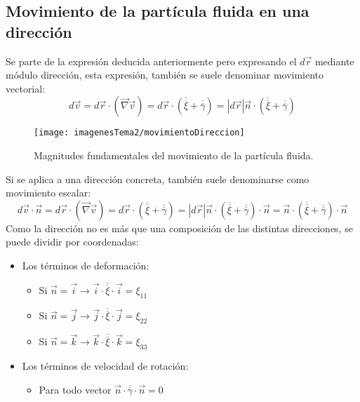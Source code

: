 \subsection{Movimiento de la partícula fluida en una dirección}
Se parte de la expresión deducida anteriormente pero expresando el $d\vec{r}$ mediante módulo dirección, esta expresión, también se suele denominar movimiento vectorial:
\[d\vec{v}=d\vec{r}\cdot\left(\vec{\nabla}\vec{v}\right)=d\vec{r}\cdot\left(\overline{\overline{\xi}}+\overline{\overline{\gamma}}\right)=|d\vec{r}|\vec{n}\cdot\left(\overline{\overline{\xi}}+\overline{\overline{\gamma}}\right)\]
\begin{figure}[H]
	\centering
	\texttt{[image: imagenesTema2/movimientoDireccion]}
	\caption{Magnitudes fundamentales del movimiento de la partícula fluida.}
	\label{fig:movimientodireccion}
\end{figure}
Si se aplica a una dirección concreta, también suele denominarse como movimiento escalar:
\[d\vec{v}\cdot\vec{n}=d\vec{r}\cdot\left(\vec{\nabla}\vec{v}\right)=d\vec{r}\cdot\left(\overline{\overline{\xi}}+\overline{\overline{\gamma}}\right)=|d\vec{r}|\vec{n}\cdot\left(\overline{\overline{\xi}}+\overline{\overline{\gamma}}\right)\cdot\vec{n}=\vec{n}\cdot\left(\overline{\overline{\xi}}+\overline{\overline{\gamma}}\right)\cdot\vec{n}\]
Como la dirección no es más que una composición de las distintas direcciones, se puede dividir por coordenadas:
\begin{itemize}
	\item Los términos de deformación:
	\begin{itemize}
		\item Si $\vec{n}=\vec{i}\rightarrow\vec{i}\cdot\overline{\overline{\xi}}\cdot\vec{i}=\xi_{11}$
		\item Si $\vec{n}=\vec{j}\rightarrow\vec{j}\cdot\overline{\overline{\xi}}\cdot\vec{j}=\xi_{22}$
		\item Si $\vec{n}=\vec{k}\rightarrow\vec{k}\cdot\overline{\overline{\xi}}\cdot\vec{k}=\xi_{33}$
	\end{itemize}
	\item Los términos de velocidad de rotación:
	\begin{itemize}
		\item Para todo vector $\vec{n}\cdot\overline{\overline{\gamma}}\cdot\vec{n}=0$
	\end{itemize}
\end{itemize}

